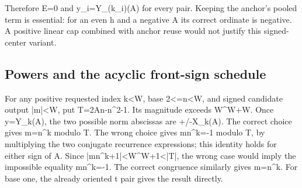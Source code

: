 Therefore E=\allowbreak{}0 and y\_\allowbreak{}i=\allowbreak{}Y\_\allowbreak{}(k\_\allowbreak{}i)(A) for every pair. Keeping the anchor's pooled term is essential: for an even h and a negative A its correct ordinate is negative. A positive linear cap combined with anchor reuse would not justify this signed-center variant.



\subsection{Powers and the acyclic front-sign schedule}



For any positive requested index k\textless{}\allowbreak{}W, base 2\textless{}\allowbreak{}=\allowbreak{}n\textless{}\allowbreak{}W, and signed candidate output |m|\textless{}\allowbreak{}W, put T=\allowbreak{}2An-n\textasciicircum{}\allowbreak{}2-1. Its magnitude exceeds W\textasciicircum{}\allowbreak{}W+\allowbreak{}W. Once y=\allowbreak{}Y\_\allowbreak{}k(A), the two possible norm abscissas are +\allowbreak{}/\allowbreak{}-X\_\allowbreak{}k(A). The correct choice gives m=\allowbreak{}n\textasciicircum{}\allowbreak{}k modulo T. The wrong choice gives m\textasteriskcentered{}\allowbreak{}n\textasciicircum{}\allowbreak{}k=\allowbreak{}-1 modulo T, by multiplying the two conjugate recurrence expressions; this identity holds for either sign of A. Since |m\textasteriskcentered{}\allowbreak{}n\textasciicircum{}\allowbreak{}k+\allowbreak{}1|\textless{}\allowbreak{}W\textasciicircum{}\allowbreak{}W+\allowbreak{}1\textless{}\allowbreak{}|T|, the wrong case would imply the impossible equality m\textasteriskcentered{}\allowbreak{}n\textasciicircum{}\allowbreak{}k=\allowbreak{}-1. The correct congruence similarly gives m=\allowbreak{}n\textasciicircum{}\allowbreak{}k. For base one, the already oriented t pair gives the result directly.



